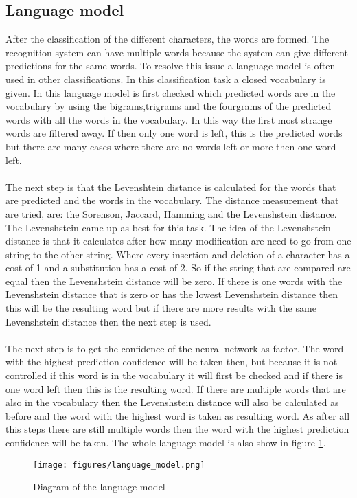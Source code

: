 \subsection{Language model}
\label{sec:lanmod}
After the classification of the different characters, the words are formed. The recognition system can have multiple words because the system can give different predictions for the same words. To resolve this issue a language model is often used in other classifications. In this classification task a closed vocabulary is given. In this language model is first checked which predicted words are in the vocabulary by using the bigrams,trigrams and the fourgrams of the predicted words with all the words in the vocabulary. In this way the first most strange words are filtered away. If then only one word is left, this is the predicted words but there are many cases where there are no words left or more then one word left.\\\\
The next step is that the Levenshtein distance is calculated for the words that are predicted and the words in the vocabulary. The distance measurement that are tried, are: the Sorenson, Jaccard, Hamming and the Levenshstein distance. The Levenshstein came up as best for this task. The idea of the Levenshstein distance is that it calculates after how many modification are need to go from one string to the other string.  Where every insertion and deletion of a character has a cost of 1 and a substitution has a cost of 2. So if the string that are compared are equal then the Levenshstein distance will be zero.  If there is one words with the Levenshstein distance that is zero or has the lowest Levenshstein distance then this will be the resulting word but if there are more results with the same Levenshstein distance then the next step is used.\\\\
The next step is to get the confidence of the neural network as factor. The word with the highest prediction confidence will be taken then, but because it is not controlled if this word is in the vocabulary it will first be checked and if there is one word left then this is the resulting word. If there are multiple words that are also in the vocabulary then the Levenshstein distance will also be calculated as before and the word with the highest word is taken as resulting word. As after all this steps there are still multiple words then the word with the highest prediction confidence will be taken. The whole language model is also show in figure \ref{Fig:languagemodel}.
\begin{figure}
\centering
\texttt{[image: figures/language\_model.png]}
\caption{Diagram of the language model}
\label{Fig:languagemodel}
\end{figure}